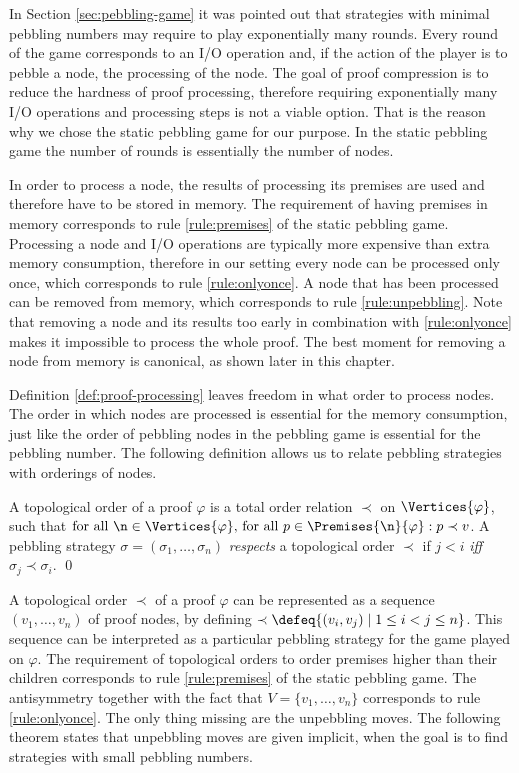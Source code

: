 In Section \ref{sec:pebbling-game} it was pointed out that strategies with minimal pebbling numbers may require to play exponentially many rounds.
Every round of the game corresponds to an I/O operation and, if the action of the player is to pebble a node, the processing of the node.
The goal of proof compression is to reduce the hardness of proof processing, therefore requiring exponentially many I/O operations and processing steps is not a viable option.
That is the reason why we chose the static pebbling game for our purpose.
In the static pebbling game the number of rounds is essentially the number of nodes.

In order to process a node, the results of processing its premises are used and therefore have to be stored in memory.
The requirement of having premises in memory corresponds to rule \ref{rule:premises} of the static pebbling game. 
Processing a node and I/O operations are typically more expensive than extra memory consumption, therefore in our setting every node can be processed only once, which corresponds to rule \ref{rule:onlyonce}.
A node that has been processed can be removed from memory, which corresponds to rule \ref{rule:unpebbling}.
Note that removing a node and its results too early in combination with \ref{rule:onlyonce} makes it impossible to process the whole proof.
The best moment for removing a node from memory is canonical, as shown later in this chapter.

Definition \ref{def:proof-processing} leaves freedom in what order to process nodes.
The order in which nodes are processed is essential for the memory consumption, just like the order of pebbling nodes in the pebbling game is essential for the pebbling number.
The following definition allows us to relate pebbling strategies with orderings of nodes.

\begin{definition}
\label{def:topological-order}
A topological order of a proof $\varphi$ is a total order relation $\prec$ on $\Vertices{\varphi}$, such that 
$\text{for all } \n \in \Vertices{\varphi} \text{, for all } p \in \Premises{\n}{\varphi}:
p \prec v$.
A pebbling strategy $\sigma = (\sigma_1,\ldots,\sigma_n)$ \emph{respects} a topological order $\prec$ if $j < i$ \emph{iff} $\sigma_j \prec \sigma_i$.
\qed
\end{definition}

A topological order $\prec$ of a proof $\varphi$ can be represented as a sequence $(v_1,\dots,v_n)$ of proof nodes, by defining $\prec \defeq \{(v_i,v_j) \mid 1 \leq i < j \leq n\}$. 
This sequence can be interpreted as a particular pebbling strategy for the game played on $\varphi$.
The requirement of topological orders to order premises higher than their children corresponds to rule \ref{rule:premises} of the static pebbling game.
The antisymmetry together with the fact that $V = \{v_1,\dots,v_n\}$ corresponds to rule \ref{rule:onlyonce}.
The only thing missing are the unpebbling moves.
The following theorem states that unpebbling moves are given implicit, when the goal is to find strategies with small pebbling numbers.


